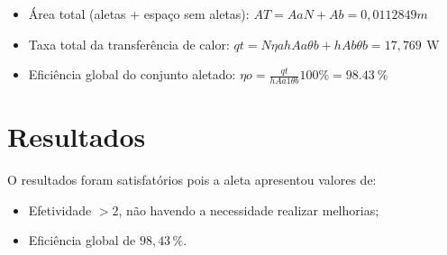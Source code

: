 \begin{itemize}[leftmargin=2cm]
    \item Área total (aletas + espaço sem aletas): \(
          {AT}={{Aa}{N}+{Ab}} = {0,0112849}m
          \)
    \item Taxa total da transferência de calor: \(
          {qt}=
          {{N}{{\eta}a}{h}{Aa}{{\theta}b}}+{{h}{Ab}{{\theta}b}}=
              {17,769\,\SI{}\watt}
          \)
    \item Eficiência global do conjunto aletado: \(
          {\eta}o=
          {\frac{qt}{{h}{Aa1}{\theta}b}}{100\%}=
          {\SI{98,43}{\percent}}
          \)
\end{itemize}

\section{
  Resultados
 }\label{sec:results}

O resultados foram satisfatórios pois a aleta apresentou valores de:
\begin{itemize}[leftmargin=2cm]
    \item Efetividade \boldmath\(> 2\), não havendo a necessidade realizar melhorias;
    \item Eficiência global de \boldmath\(98,43\,\%\).
\end{itemize}